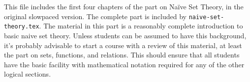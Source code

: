 \documentclass[../../include/open-logic-part]{subfiles}
\begin{document}

\begin{editorial}
  This file includes the first four chapters of the part on Na\"ive
  Set Theory, in the original slowpaced version. The complete part is
  included by \verb|naive-set-theory.tex|.
  The material in this part is a reasonably complete introduction to
  basic naive set theory. Unless students can be assumed to have this
  background, it's probably advisable to start a course with a review
  of this material, at least the part on sets, functions, and
  relations. This should ensure that all students have the basic
  facility with mathematical notation required for any of the other
  logical sections.
\end{editorial}





\OLEndPartHook
\end{document}
